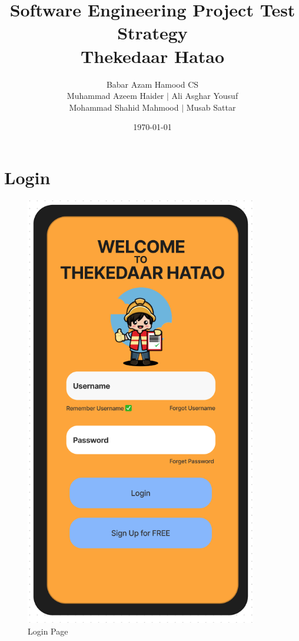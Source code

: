 \documentclass[title page]{article}
\title{Software Engineering Project Test Strategy\\
        Thekedaar Hatao}
\author{Babar Azam Hamood CS\\
        Muhammad Azeem Haider $\mid$ Ali Asghar Yousuf \\
        Mohammad Shahid Mahmood $\mid$ Musab Sattar}
\date{\today}
\begin{document}
\maketitle

\section{Login}
\begin{figure}[!h]
    \begin{center}
          \includegraphics[height=19cm]{images/login.png}
          \caption{Login Page}
          \label{fig:login}
    \end{center}
\end{figure}
\end{document}
